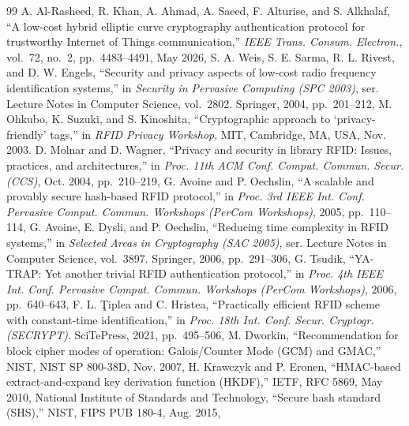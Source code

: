 \begin{thebibliography}{99}
 A. Al-Rasheed, R. Khan, A. Ahmad, A. Saeed, F. Alturise, and S. Alkhalaf, ``A low-cost hybrid elliptic curve cryptography authentication protocol for trustworthy Internet of Things communication,'' \emph{IEEE Trans. Consum. Electron.}, vol.~72, no.~2, pp.~4483--4491, May 2026, 
 S. A. Weis, S. E. Sarma, R. L. Rivest, and D. W. Engels, ``Security and privacy aspects of low-cost radio frequency identification systems,'' in \emph{Security in Pervasive Computing (SPC 2003)}, ser. Lecture Notes in Computer Science, vol.~2802. Springer, 2004, pp.~201--212, 
 M. Ohkubo, K. Suzuki, and S. Kinoshita, ``Cryptographic approach to `privacy-friendly' tags,'' in \emph{RFID Privacy Workshop}, MIT, Cambridge, MA, USA, Nov. 2003.
 D. Molnar and D. Wagner, ``Privacy and security in library RFID: Issues, practices, and architectures,'' in \emph{Proc. 11th ACM Conf. Comput. Commun. Secur. (CCS)}, Oct. 2004, pp.~210--219, 
 G. Avoine and P. Oechslin, ``A scalable and provably secure hash-based RFID protocol,'' in \emph{Proc. 3rd IEEE Int. Conf. Pervasive Comput. Commun. Workshops (PerCom Workshops)}, 2005, pp.~110--114, 
 G. Avoine, E. Dysli, and P. Oechslin, ``Reducing time complexity in RFID systems,'' in \emph{Selected Areas in Cryptography (SAC 2005)}, ser. Lecture Notes in Computer Science, vol.~3897. Springer, 2006, pp.~291--306, 
 G. Tsudik, ``YA-TRAP: Yet another trivial RFID authentication protocol,'' in \emph{Proc. 4th IEEE Int. Conf. Pervasive Comput. Commun. Workshops (PerCom Workshops)}, 2006, pp.~640--643, 
 F. L. \c{T}iplea and C. Hristea, ``Practically efficient RFID scheme with constant-time identification,'' in \emph{Proc. 18th Int. Conf. Secur. Cryptogr. (SECRYPT)}. SciTePress, 2021, pp.~495--506, 
 M. Dworkin, ``Recommendation for block cipher modes of operation: Galois/Counter Mode (GCM) and GMAC,'' NIST, NIST SP 800-38D, Nov. 2007, 
 H. Krawczyk and P. Eronen, ``HMAC-based extract-and-expand key derivation function (HKDF),'' IETF, RFC 5869, May 2010, 
 National Institute of Standards and Technology, ``Secure hash standard (SHS),'' NIST, FIPS PUB 180-4, Aug. 2015, 

\end{thebibliography}
